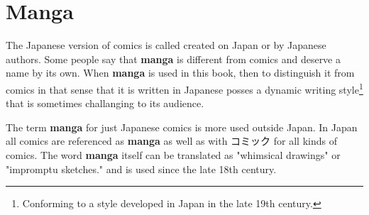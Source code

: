 \section{Manga} 
\label{sec:Manga}

The Japanese version of comics is called 
created on Japan or by Japanese authors. Some people say that \textbf{manga} is
different from comics and deserve a name by its own. When \textbf{manga} is
used in this book, then to distinguish it from comics in that sense that it is
written in Japanese posses a dynamic writing style\footnote{Conforming to a
style developed in Japan in the late 19th century.}  that is sometimes
challanging to its audience.

The term \textbf{manga} for just Japanese comics is more used outside Japan. In
Japan all comics are referenced as \textbf{manga} as well as with {コミック}
 for all kinds of comics. The word \textbf{manga} itself can be
translated as "whimsical drawings" or "impromptu sketches." and is used since
the late 18th century.


